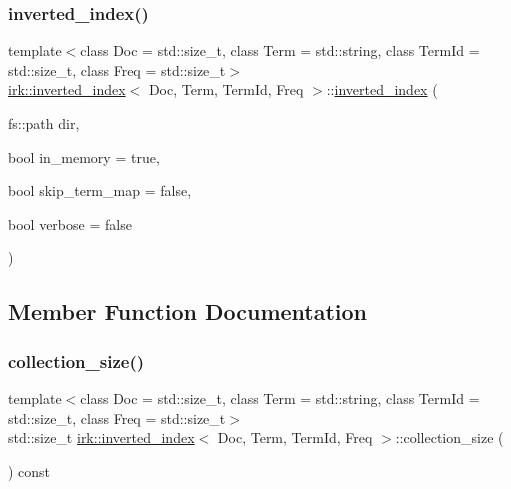 \subsubsection{\texorpdfstring{inverted\+\_\+index()}{inverted\_index()}\hspace{0.1cm}{\footnotesize\ttfamily [2/2]}}
{\footnotesize\ttfamily template$<$class Doc  = std\+::size\+\_\+t, class Term  = std\+::string, class Term\+Id  = std\+::size\+\_\+t, class Freq  = std\+::size\+\_\+t$>$ \\
\mbox{\hyperlink{classirk_1_1inverted__index}{irk\+::inverted\+\_\+index}}$<$ Doc, Term, Term\+Id, Freq $>$\+::\mbox{\hyperlink{classirk_1_1inverted__index}{inverted\+\_\+index}} (\begin{DoxyParamCaption}\item[{fs\+::path}]{dir,  }\item[{bool}]{in\+\_\+memory = {\ttfamily true},  }\item[{bool}]{skip\+\_\+term\+\_\+map = {\ttfamily false},  }\item[{bool}]{verbose = {\ttfamily false} }\end{DoxyParamCaption})\hspace{0.3cm}{\ttfamily [inline]}}



\subsection{Member Function Documentation}
\mbox{\label{classirk_1_1inverted__index_a6666e1a0c0facdec6c805abc153a9ea7}} 
\subsubsection{\texorpdfstring{collection\+\_\+size()}{collection\_size()}}
{\footnotesize\ttfamily template$<$class Doc  = std\+::size\+\_\+t, class Term  = std\+::string, class Term\+Id  = std\+::size\+\_\+t, class Freq  = std\+::size\+\_\+t$>$ \\
std\+::size\+\_\+t \mbox{\hyperlink{classirk_1_1inverted__index}{irk\+::inverted\+\_\+index}}$<$ Doc, Term, Term\+Id, Freq $>$\+::collection\+\_\+size (\begin{DoxyParamCaption}{ }\end{DoxyParamCaption}) const\hspace{0.3cm}{\ttfamily [inline]}}

